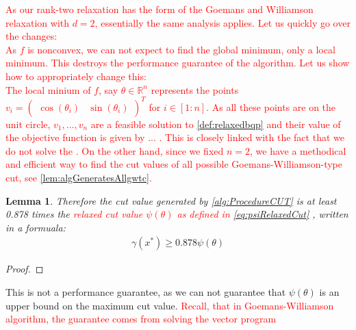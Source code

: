 \documentclass[12pt,a4paper]{article}
\theoremstyle{mythm}
\newtheorem{lem}[thm]{Lemma}
\begin{document}
\textcolor{red}{As our rank-two relaxation has the form of the Goemans and Williamson relaxation with $ d=2 $, essentially the same analysis applies.}
\textcolor{red}{Let us quickly go over the changes: \\
As $ f $ is nonconvex, we can not expect to find the global minimum, only a local minimum.
This destroys the performance guarantee of the algorithm.
Let us show how to appropriately change this: \\
The local minium of $ f $, say $ \theta \in \mathbb{R} ^{ n } $ represents the points 
$
v_i =
\begin{pmatrix}
\cos( \theta_i ) &
\sin( \theta_i ) 
\end{pmatrix} ^{ T }  
$ for $ i \in \left[ 1:n \right]  $.
As all these points are on the unit circle, $ v_1 , \dots, v_n $ are a feasible solution to \ref{def:relaxedbqp} and their value of the objective function is given by ...
.
This is closely linked with the fact that we do not solve the \SDP.
On the other hand, since we fixed $ n = 2 $, we have a methodical and efficient way to find the cut values of all possible Goemans-Williamson-type cut, see
\ref{lem:algGeneratesAllgwtc}.
}
\begin{lem}
Therefore the cut value generated by \ref{alg:ProcedureCUT} is at least 0.878 times the \textcolor{red}{relaxed cut value $ \psi (\theta) $ as defined in
\ref{eq:psiRelaxedCut} }, written in a formuala:
\begin{align}
\label{eq:perfguarantee} 
\gamma (x^*) \geq 0.878 \psi (\theta) 
\end{align} 
\end{lem} 
\begin{proof}

\end{proof}
This is not a performance guarantee, as we can not guarantee that $ \psi ( \theta)  $ is an upper bound on the maximum cut value.
\textcolor{red}{Recall, that in Goemans-Williamson algorithm, the guarantee comes from solving the \textcolor{red}{vector program}}
\end{document}
